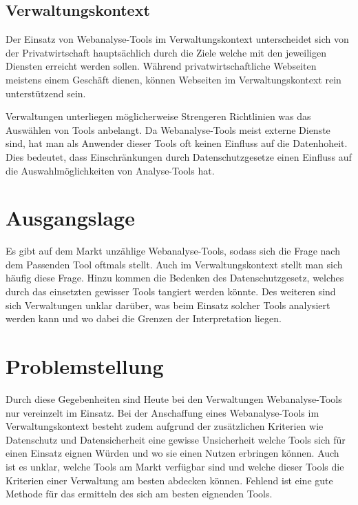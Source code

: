 \subsection{Verwaltungskontext}

Der Einsatz von Webanalyse-Tools im Verwaltungskontext unterscheidet sich von der Privatwirtschaft hauptsächlich durch die Ziele welche mit den jeweiligen Diensten erreicht werden sollen. Während privatwirtschaftliche Webseiten meistens einem Geschäft dienen, können Webseiten im Verwaltungskontext rein unterstützend sein.

Verwaltungen unterliegen möglicherweise Strengeren Richtlinien was das Auswählen von Tools anbelangt. Da Webanalyse-Tools meist externe Dienste sind, hat man als Anwender dieser Tools oft keinen Einfluss auf die Datenhoheit. Dies bedeutet, dass Einschränkungen durch Datenschutzgesetze einen Einfluss auf die Auswahlmöglichkeiten von Analyse-Tools hat.


\section{Ausgangslage}
Es gibt auf dem Markt unzählige Webanalyse-Tools, sodass sich die Frage nach dem Passenden Tool oftmals stellt. Auch im Verwaltungskontext stellt man sich häufig diese Frage. Hinzu kommen die Bedenken des Datenschutzgesetz, welches durch das einsetzten gewisser Tools tangiert werden könnte. Des weiteren sind sich Verwaltungen unklar darüber, was beim Einsatz solcher Tools analysiert werden kann und wo dabei die Grenzen der Interpretation liegen.

\section{Problemstellung}

Durch diese Gegebenheiten sind Heute bei den Verwaltungen Webanalyse-Tools nur vereinzelt im Einsatz. Bei der Anschaffung eines Webanalyse-Tools im Verwaltungskontext besteht zudem aufgrund der zusätzlichen Kriterien wie Datenschutz und Datensicherheit eine gewisse Unsicherheit welche Tools sich für einen Einsatz eignen Würden und wo sie einen Nutzen erbringen können. Auch ist es unklar, welche Tools am Markt verfügbar sind und welche dieser Tools die Kriterien einer Verwaltung am besten abdecken können. Fehlend ist eine gute Methode für das ermitteln des sich am besten eignenden Tools.
